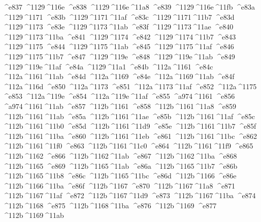 \checkit ^^^^e837 ^^^^1129^^^^116e
\checkit ^^^^e838 ^^^^1129^^^^116e^^^^11a8
\checkit ^^^^e839 ^^^^1129^^^^116e^^^^11fb
\checkit ^^^^e83a ^^^^1129^^^^1171
\checkit ^^^^e83b ^^^^1129^^^^1171^^^^11af
\checkit ^^^^e83c ^^^^1129^^^^1171^^^^11b7
\checkit ^^^^e83d ^^^^1129^^^^1173
\checkit ^^^^e83e ^^^^1129^^^^1173^^^^11ab
\checkit ^^^^e83f ^^^^1129^^^^1173^^^^11ae
\checkit ^^^^e840 ^^^^1129^^^^1173^^^^11ba
\checkit ^^^^e841 ^^^^1129^^^^1174
\checkit ^^^^e842 ^^^^1129^^^^1174^^^^11b7
\checkit ^^^^e843 ^^^^1129^^^^1175
\checkit ^^^^e844 ^^^^1129^^^^1175^^^^11ab
\checkit ^^^^e845 ^^^^1129^^^^1175^^^^11af
\checkit ^^^^e846 ^^^^1129^^^^1175^^^^11b7
\checkit ^^^^e847 ^^^^1129^^^^119e
\checkit ^^^^e848 ^^^^1129^^^^119e^^^^11ab
\checkit ^^^^e849 ^^^^1129^^^^119e^^^^11af
\checkit ^^^^e84a ^^^^1129^^^^11a1
\checkit ^^^^e84b ^^^^112a^^^^1161
\checkit ^^^^e84c ^^^^112a^^^^1161^^^^11ab
\checkit ^^^^e84d ^^^^112a^^^^1169
\checkit ^^^^e84e ^^^^112a^^^^1169^^^^11ab
\checkit ^^^^e84f ^^^^112a^^^^116d
\checkit ^^^^e850 ^^^^112a^^^^1173
\checkit ^^^^e851 ^^^^112a^^^^1173^^^^11af
\checkit ^^^^e852 ^^^^112a^^^^1175
\checkit ^^^^e853 ^^^^112a^^^^119e
\checkit ^^^^e854 ^^^^112a^^^^119e^^^^11af
\checkit ^^^^e855 ^^^^a974^^^^1161
\checkit ^^^^e856 ^^^^a974^^^^1161^^^^11ab
\checkit ^^^^e857 ^^^^112b^^^^1161
\checkit ^^^^e858 ^^^^112b^^^^1161^^^^11a8
\checkit ^^^^e859 ^^^^112b^^^^1161^^^^11ab
\checkit ^^^^e85a ^^^^112b^^^^1161^^^^11ae
\checkit ^^^^e85b ^^^^112b^^^^1161^^^^11af
\checkit ^^^^e85c ^^^^112b^^^^1161^^^^11b0
\checkit ^^^^e85d ^^^^112b^^^^1161^^^^11d9
\checkit ^^^^e85e ^^^^112b^^^^1161^^^^11b7
\checkit ^^^^e85f ^^^^112b^^^^1161^^^^11ba
\checkit ^^^^e860 ^^^^112b^^^^1161^^^^11eb
\checkit ^^^^e861 ^^^^112b^^^^1161^^^^11bc
\checkit ^^^^e862 ^^^^112b^^^^1161^^^^11f0
\checkit ^^^^e863 ^^^^112b^^^^1161^^^^11c0
\checkit ^^^^e864 ^^^^112b^^^^1161^^^^11f9
\checkit ^^^^e865 ^^^^112b^^^^1162
\checkit ^^^^e866 ^^^^112b^^^^1162^^^^11ab
\checkit ^^^^e867 ^^^^112b^^^^1162^^^^11ba
\checkit ^^^^e868 ^^^^112b^^^^1165
\checkit ^^^^e869 ^^^^112b^^^^1165^^^^11ab
\checkit ^^^^e86a ^^^^112b^^^^1165^^^^11b7
\checkit ^^^^e86b ^^^^112b^^^^1165^^^^11b8
\checkit ^^^^e86c ^^^^112b^^^^1165^^^^11bc
\checkit ^^^^e86d ^^^^112b^^^^1166
\checkit ^^^^e86e ^^^^112b^^^^1166^^^^11ba
\checkit ^^^^e86f ^^^^112b^^^^1167
\checkit ^^^^e870 ^^^^112b^^^^1167^^^^11a8
\checkit ^^^^e871 ^^^^112b^^^^1167^^^^11af
\checkit ^^^^e872 ^^^^112b^^^^1167^^^^11d9
\checkit ^^^^e873 ^^^^112b^^^^1167^^^^11ba
\checkit ^^^^e874 ^^^^112b^^^^1168
\checkit ^^^^e875 ^^^^112b^^^^1168^^^^11ba
\checkit ^^^^e876 ^^^^112b^^^^1169
\checkit ^^^^e877 ^^^^112b^^^^1169^^^^11ab
